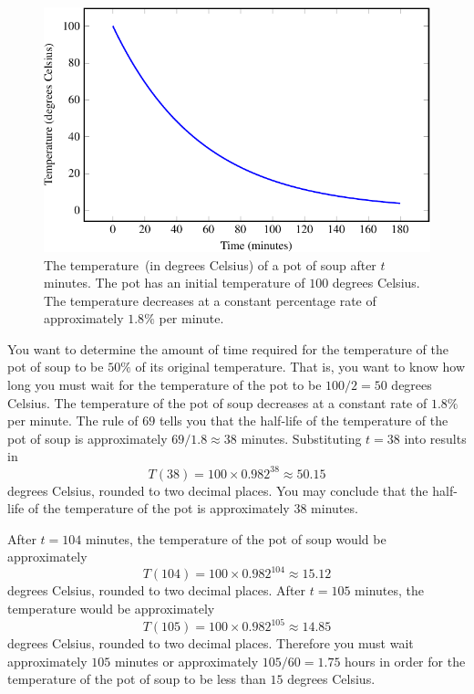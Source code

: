 \documentclass[a4paper,oneside,12pt]{article}
\begin{document}
{\begin{solution}
\begin{figure}[!htbp]
\centering
\includegraphics[scale=1.1]{image/11/soup.pdf}
\caption{%
  The temperature~(in degrees Celsius) of a pot of soup after $t$
  minutes.  The pot has an initial temperature of $100$ degrees
  Celsius.  The temperature decreases at a constant percentage rate of
  approximately $1.8\%$ per minute.
}
\label{fig:soup_temperature}
\end{figure}

You want to determine the amount of time required for the temperature
of the pot of soup to be $50\%$ of its original temperature.  That is,
you want to know how long you must wait for the temperature of the pot
to be $100 / 2 = 50$ degrees Celsius.  The temperature of the pot of
soup decreases at a constant rate of $1.8\%$ per minute.  The rule of
$69$ tells you that the half-life of the temperature of the pot of
soup is approximately $69 / 1.8 \approx 38$ minutes.  Substituting
$t = 38$ into  results in
\[
T(38)
=
100 \times 0.982^{38}
\approx
50.15
\]
degrees Celsius, rounded to two decimal places.  You may conclude
that the half-life of the temperature of the pot is approximately $38$
minutes.

After $t = 104$ minutes, the temperature of the pot of soup would be
approximately
\[
T(104)
=
100 \times 0.982^{104}
\approx
15.12
\]
degrees Celsius, rounded to two decimal places.  After $t = 105$
minutes, the temperature would be approximately
\[
T(105)
=
100 \times 0.982^{105}
\approx
14.85
\]
degrees Celsius, rounded to two decimal places.  Therefore you must
wait approximately $105$ minutes or approximately
$105 / 60 = 1.75$ hours in order for the temperature of the pot of
soup to be less than $15$ degrees Celsius.
\end{solution}
}{}
\end{document}

